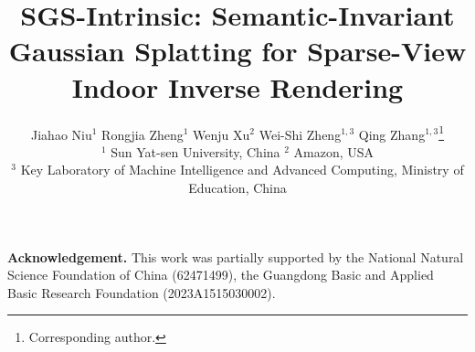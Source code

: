\documentclass[10pt,twocolumn,letterpaper]{article}
\title{SGS-Intrinsic: Semantic-Invariant Gaussian Splatting for Sparse-View Indoor Inverse Rendering}
\author{
    Jiahao Niu$^1$ \quad Rongjia Zheng$^1$ \quad Wenju Xu$^2$ \quad Wei-Shi Zheng$^{1,3}$ \quad Qing Zhang$^{1,3}$\thanks{Corresponding author.} \\
    \small $^1$ Sun Yat-sen University, China \quad $^2$ Amazon, USA \\
    \small $^3$ Key Laboratory of Machine Intelligence and Advanced Computing, Ministry of Education, China
}
\begin{document}


\twocolumn[
    \maketitle
    \vspace{-3.0em}
    
    \bigbreak
]

\begingroup
\renewcommand\thefootnote{}
\endgroup


    

% 





\vspace{0.5em}
\noindent\textbf{Acknowledgement.} This work was partially supported by the National Natural Science Foundation of China (62471499), the Guangdong Basic and Applied Basic Research Foundation (2023A1515030002).

{
    \small
    
    
}

\end{document}
